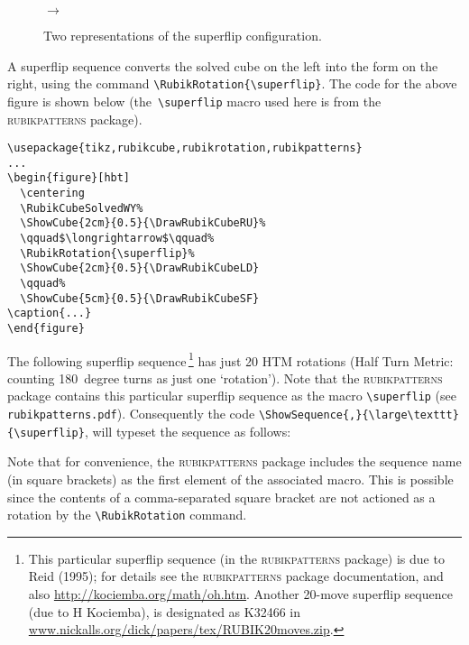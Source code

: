 \documentclass[a4paper]{article}
\begin{document}
\begin{figure}[hbt]
  \centering
  \RubikCubeSolvedWY%
  \qquad$\longrightarrow$\qquad%
  \RubikRotation{\superflip}%
  \qquad%
\caption{Two representations of the superflip configuration.}
\end{figure}

{\noindent}A superflip sequence converts the solved cube on the left 
into the form on the right, using the command \verb!\RubikRotation{\superflip}!.
The  code for the above figure is shown below (the~\verb!\superflip! macro 
used here  is from the \textsc{rubikpatterns} package).
\begin{verbatim}
\usepackage{tikz,rubikcube,rubikrotation,rubikpatterns}
...
\begin{figure}[hbt]
  \centering
  \RubikCubeSolvedWY%
  \ShowCube{2cm}{0.5}{\DrawRubikCubeRU}%
  \qquad$\longrightarrow$\qquad%
  \RubikRotation{\superflip}%
  \ShowCube{2cm}{0.5}{\DrawRubikCubeLD}
  \qquad%
  \ShowCube{5cm}{0.5}{\DrawRubikCubeSF}
\caption{...}
\end{figure}
\end{verbatim}


The following superflip sequence\,\footnote{This particular  superflip 
sequence (in the \textsc{rubikpatterns} package) is due to Reid (1995); 
for details see the \textsc{rubikpatterns} package documentation, and 
also  \url{http://kociemba.org/math/oh.htm}. 
Another 20-move superflip sequence (due to H Kociemba),  is designated 
as  K32466  in  \url{www.nickalls.org/dick/papers/tex/RUBIK20moves.zip}.} 
has just 20  HTM rotations (Half Turn Metric: counting 180~degree turns 
as just one `rotation'). Note that the \textsc{rubikpatterns} package 
contains  this particular superflip sequence  as the macro \verb!\superflip!
(see \texttt{rubikpatterns.pdf}). Consequently  the  code 
\verb!\ShowSequence{,}{\large\texttt}{\superflip}!, will typeset the sequence
as follows:

\begin{center}
\ShowSequence{,}{\texttt}{\superflip}
\end{center}
Note that for convenience, the \textsc{rubikpatterns} package includes 
the sequence name (in square brackets)  as the first element of the 
associated  macro. This is possible since the contents of a comma-separated 
square bracket  are not actioned as a rotation by the \verb!\RubikRotation! 
command.   
\end{document}
